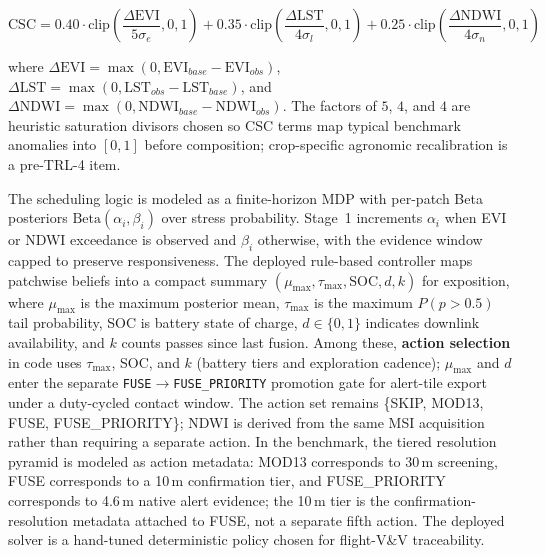 \documentclass[11pt,letterpaper]{article}
\begin{document}
\begin{equation}
\text{CSC} = 0.40 \cdot \text{clip}\!\left(\frac{\Delta\text{EVI}}{5\sigma_e}, 0, 1\right)
           + 0.35 \cdot \text{clip}\!\left(\frac{\Delta\text{LST}}{4\sigma_l}, 0, 1\right)
           + 0.25 \cdot \text{clip}\!\left(\frac{\Delta\text{NDWI}}{4\sigma_n}, 0, 1\right)
\label{eq:csc}
\end{equation}

where $\Delta\text{EVI} = \max(0, \text{EVI}_{base} - \text{EVI}_{obs})$, $\Delta\text{LST} = \max(0, \text{LST}_{obs} - \text{LST}_{base})$, and $\Delta\text{NDWI} = \max(0, \text{NDWI}_{base} - \text{NDWI}_{obs})$.
The factors of $5$, $4$, and $4$ are heuristic saturation divisors chosen so CSC terms map typical benchmark anomalies into $[0,1]$ before composition; crop-specific agronomic recalibration is a pre-TRL-4 item.

The scheduling logic is modeled as a finite-horizon MDP with per-patch Beta posteriors $\text{Beta}(\alpha_i,\beta_i)$ over stress probability. Stage~1 increments $\alpha_i$ when EVI or NDWI exceedance is observed and $\beta_i$ otherwise, with the evidence window capped to preserve responsiveness. The deployed rule-based controller maps patchwise beliefs into a compact summary $(\mu_{\max}, \tau_{\max}, \text{SOC}, d, k)$ for exposition, where $\mu_{\max}$ is the maximum posterior mean, $\tau_{\max}$ is the maximum $P(p > 0.5)$ tail probability, SOC is battery state of charge, $d \in \{0,1\}$ indicates downlink availability, and $k$ counts passes since last fusion. Among these, \textbf{action selection} in code uses $\tau_{\max}$, SOC, and $k$ (battery tiers and exploration cadence); $\mu_{\max}$ and $d$ enter the separate \texttt{FUSE}$\rightarrow$\texttt{FUSE\_PRIORITY} promotion gate for alert-tile export under a duty-cycled contact window. The action set remains \{SKIP, MOD13, FUSE, FUSE\_PRIORITY\}; NDWI is derived from the same MSI acquisition rather than requiring a separate action. In the benchmark, the tiered resolution pyramid is modeled as action metadata: MOD13 corresponds to 30\,m screening, FUSE corresponds to a 10\,m confirmation tier, and FUSE\_PRIORITY corresponds to 4.6\,m native alert evidence; the 10\,m tier is the confirmation-resolution metadata attached to FUSE, not a separate fifth action. The deployed solver is a hand-tuned deterministic policy chosen for flight-V\&V traceability.
\end{document}
